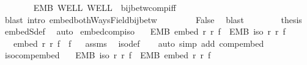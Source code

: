 \begin{isabellebody}
\ \ \ \ \ \ \isamarkupfalse%
\ EMB\ WELL\ WELL{\isacharprime}{\kern0pt}\ {\isasymsection}\ bij{\isacharunderscore}{\kern0pt}betw{\isacharunderscore}{\kern0pt}comp{\isacharunderscore}{\kern0pt}iff\ \isamarkupfalse%
\ {\isacharparenleft}{\kern0pt}blast\ intro{\isacharcolon}{\kern0pt}\ embed{\isacharunderscore}{\kern0pt}bothWays{\isacharunderscore}{\kern0pt}Field{\isacharunderscore}{\kern0pt}bij{\isacharunderscore}{\kern0pt}betw{\isacharparenright}{\kern0pt}\isanewline
\ \ \ \ \isamarkupfalse%
\ {}\ \isamarkupfalse%
\ False\ \isamarkupfalse%
\ blast\isanewline
\ \ \isacommand{{\isacharbraceright}{\kern0pt}}\isamarkupfalse%
\isanewline
\ \ \isamarkupfalse%
\ \isamarkupfalse%
\ {\isacharquery}{\kern0pt}thesis\ \isamarkupfalse%
\ embedS{\isacharunderscore}{\kern0pt}def\ \isamarkupfalse%
\ auto\isanewline
{}\isamarkupfalse%
%
\endisatagproof
{\isafoldproof}%
%
\isadelimproof
\isanewline
%
\endisadelimproof
\isanewline
{}\isamarkupfalse%
\ embed{\isacharunderscore}{\kern0pt}comp{\isacharunderscore}{\kern0pt}iso{\isacharcolon}{\kern0pt}\isanewline
\ \ \ EMB{\isacharcolon}{\kern0pt}\ {\isachardoublequoteopen}embed\ r\ r{\isacharprime}{\kern0pt}\ f{\isachardoublequoteclose}\ \ EMB{\isacharprime}{\kern0pt}{\isacharcolon}{\kern0pt}\ {\isachardoublequoteopen}iso\ r{\isacharprime}{\kern0pt}\ r{\isacharprime}{\kern0pt}{\isacharprime}{\kern0pt}\ f{\isacharprime}{\kern0pt}{\isachardoublequoteclose}\isanewline
\ \ \ {\isachardoublequoteopen}embed\ r\ r{\isacharprime}{\kern0pt}{\isacharprime}{\kern0pt}\ {\isacharparenleft}{\kern0pt}f{\isacharprime}{\kern0pt}\ {\isasymcirc}\ f{\isacharparenright}{\kern0pt}{\isachardoublequoteclose}%
\isadelimproof
\ %
\endisadelimproof
%
\isatagproof
{}\isamarkupfalse%
\ assms\ \isamarkupfalse%
\ iso{\isacharunderscore}{\kern0pt}def\isanewline
\ \ \isamarkupfalse%
\ {\isacharparenleft}{\kern0pt}auto\ simp\ add{\isacharcolon}{\kern0pt}\ comp{\isacharunderscore}{\kern0pt}embed{\isacharparenright}{\kern0pt}%
\endisatagproof
{\isafoldproof}%
%
\isadelimproof
%
\endisadelimproof
\isanewline
\isanewline
{}\isamarkupfalse%
\ iso{\isacharunderscore}{\kern0pt}comp{\isacharunderscore}{\kern0pt}embed{\isacharcolon}{\kern0pt}\isanewline
\ \ \ EMB{\isacharcolon}{\kern0pt}\ {\isachardoublequoteopen}iso\ r\ r{\isacharprime}{\kern0pt}\ f{\isachardoublequoteclose}\ \ EMB{\isacharprime}{\kern0pt}{\isacharcolon}{\kern0pt}\ {\isachardoublequoteopen}embed\ r{\isacharprime}{\kern0pt}\ r{\isacharprime}{\kern0pt}{\isacharprime}{\kern0pt}\ f{\isacharprime}{\kern0pt}{\isachardoublequoteclose}\isanewline

\end{isabellebody}

